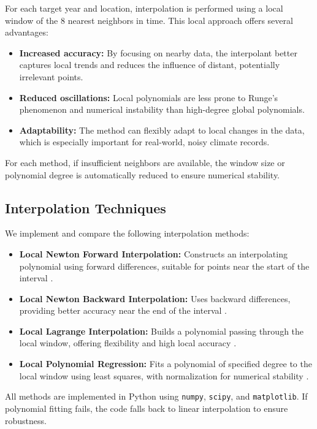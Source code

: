 For each target year and location, interpolation is performed using a local window of the 8 nearest neighbors in time. This local approach offers several advantages:
\begin{itemize}
    \item \textbf{Increased accuracy:} By focusing on nearby data, the interpolant better captures local trends and reduces the influence of distant, potentially irrelevant points.
    \item \textbf{Reduced oscillations:} Local polynomials are less prone to Runge's phenomenon and numerical instability than high-degree global polynomials.
    \item \textbf{Adaptability:} The method can flexibly adapt to local changes in the data, which is especially important for real-world, noisy climate records.
\end{itemize}
For each method, if insufficient neighbors are available, the window size or polynomial degree is automatically reduced to ensure numerical stability.

\subsection{Interpolation Techniques}

We implement and compare the following interpolation methods:
\begin{itemize}
    \item \textbf{Local Newton Forward Interpolation:} Constructs an interpolating polynomial using forward differences, suitable for points near the start of the interval \cite{atkinson1989introduction, burden2011numerical, garcia2022newton}.
    \item \textbf{Local Newton Backward Interpolation:} Uses backward differences, providing better accuracy near the end of the interval \cite{garcia2022newton}.
    \item \textbf{Local Lagrange Interpolation:} Builds a polynomial passing through the local window, offering flexibility and high local accuracy \cite{atkinson1989introduction, smith2020numerical, lee2019comparison}.
    \item \textbf{Local Polynomial Regression:} Fits a polynomial of specified degree to the local window using least squares, with normalization for numerical stability \cite{brown2021polynomial, press2007numerical}.
\end{itemize}

All methods are implemented in Python using \texttt{numpy}, \texttt{scipy}, and \texttt{matplotlib}. If polynomial fitting fails, the code falls back to linear interpolation to ensure robustness.


